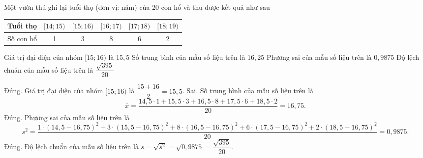 \begin{ex}%
Một vườn thú ghi lại tuổi thọ (đơn vị: năm) của 20 con hổ và thu được kết quả như sau
\begin{center}
\begin{tabular}{|l|c|c|c|c|c|}
\hline Tuổi thọ & {$[14 ; 15)$} & {$[15 ; 16)$} & {$[16 ; 17)$} & {$[17 ; 18)$} & {$[18 ; 19)$} \\
\hline Số con hổ & 1 & 3 & 8 & 6 & 2 \\
\hline
\end{tabular}
\end{center}
\choiceTF
{\True Giá trị đại diện của nhóm $[15 ; 16)$ là $15{,}5$}
{Số trung bình của mẫu số liệu trên là $16{,}25$}
{\True Phương sai của mẫu số liệu trên là $0{,}9875$}
{\True Độ lệch chuẩn của mẫu số liệu trên là $\dfrac{\sqrt{395}}{20}$}
\loigiai
{
\begin{itemchoice}
\itemch Đúng. Giá trị đại diện của nhóm $[15 ; 16)$ là $\dfrac{15+16}{2}=15{,}5$.
\itemch Sai. Số trung bình của mẫu số liệu trên là
$$\bar{x}=\dfrac{14{,}5\cdot 1+15{,}5\cdot 3+16{,}5\cdot 8+17{,}5\cdot 6+18{,}5\cdot 2}{20}=16{,}75.$$
\itemch Đúng. Phương sai của mẫu số liệu trên là
$$s^2=\dfrac{1 \cdot(14{,}5-16{,}75)^2+3 \cdot(15{,}5-16{,}75)^2+8 \cdot(16{,}5-16{,}75)^2+6 \cdot(17{,}5-16{,}75)^2+2 \cdot(18{,}5-16{,}75)^2}{20}=0{,}9875.$$
\itemch Đúng.  Độ lệch chuẩn của mẫu số liệu trên là $s=\sqrt{s^2}=\sqrt{0{,}9875}=\dfrac{\sqrt{395}}{20}$.
\end{itemchoice}
}
\end{ex}

